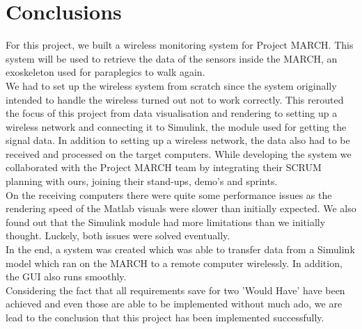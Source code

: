 \chapter{Conclusions}
\label{ch:con}
For this project, we built a wireless monitoring system for Project MARCH. This system will be used to retrieve the data of the sensors inside the MARCH, an exoskeleton used for paraplegics to walk again.\\	
We had to set up the wireless system from scratch since the system originally intended to handle the wireless turned out not to work correctly. This rerouted the focus of this project from data visualisation and rendering to setting up a wireless network and connecting it to Simulink, the module used for getting the signal data. In addition to setting up a wireless network, the data also had to be received and processed on the target computers. While developing the system we collaborated with the Project MARCH team by integrating their SCRUM planning with ours, joining their stand-ups, demo's and sprints.   \\
On the receiving computers there were quite some performance issues as the rendering speed of the Matlab visuals were slower than initially expected. We also found out that the Simulink module had more limitations than we initially thought. Luckely, both issues were solved eventually. \\
In the end, a system was created which was able to transfer data from a Simulink model which ran on the MARCH to a remote computer wirelessly. In addition, the GUI also runs smoothly. 
\\ Considering the fact that all requirements save for two 'Would Have' have been achieved and even those are able to be implemented without much ado, we are lead to the conclusion that this project has been implemented successfully.  